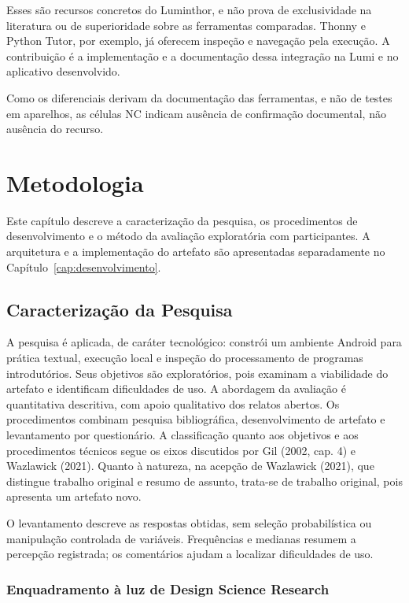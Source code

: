 \documentclass[
    12pt
    ,oneside
    ,a4paper
    ,chapter=TITLE
    ,section=TITLE
    ,sumario=abnt-6027-2012]{abntex2}
\begin{document}
Esses são recursos concretos do Luminthor, e não prova de exclusividade na
literatura ou de superioridade sobre as ferramentas comparadas. Thonny e
Python Tutor, por exemplo, já oferecem inspeção e navegação pela execução.
A contribuição é a implementação e a documentação dessa integração na Lumi
e no aplicativo desenvolvido.

Como os diferenciais derivam da documentação das ferramentas, e não de testes
em aparelhos, as células NC indicam ausência de confirmação documental, não
ausência do recurso.

\chapter{Metodologia}
\label{cap:metodologia}

Este capítulo descreve a caracterização da pesquisa, os procedimentos de
desenvolvimento e o método da avaliação exploratória com participantes.
A arquitetura e a implementação do artefato são apresentadas separadamente
no Capítulo~\ref{cap:desenvolvimento}.

\section{Caracterização da Pesquisa}

A pesquisa é aplicada, de caráter tecnológico: constrói um ambiente Android para
prática textual, execução local e inspeção do processamento de programas
introdutórios. Seus objetivos são exploratórios, pois examinam a viabilidade do
artefato e identificam dificuldades de uso. A abordagem da avaliação é quantitativa
descritiva, com apoio qualitativo dos relatos abertos. Os procedimentos combinam
pesquisa bibliográfica, desenvolvimento de artefato e levantamento por questionário.
A classificação quanto aos objetivos e aos procedimentos técnicos segue os eixos
discutidos por Gil (2002, cap. 4) e Wazlawick (2021). Quanto à natureza, na acepção
de Wazlawick (2021), que distingue trabalho original e resumo de assunto, trata-se
de trabalho original, pois apresenta um artefato novo.

O levantamento descreve as respostas obtidas, sem seleção probabilística ou
manipulação controlada de variáveis. 
Frequências e medianas resumem a percepção registrada; os comentários ajudam a
localizar dificuldades de uso.

\subsection{Enquadramento à luz de Design Science Research}
\end{document}
